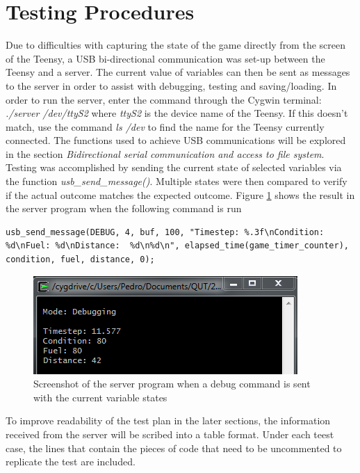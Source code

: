 \documentclass{article}
\begin{document}
\section{Testing Procedures}
Due to difficulties with capturing the state of the game directly from the screen of the Teensy, a USB bi-directional communication was set-up between the Teensy and a server. The current value of variables can then be sent as messages to the server in order to assist with debugging, testing and saving/loading. 
\newline
\newline
In order to run the server, enter the command through the Cygwin terminal: \emph{./server /dev/ttyS2} where \emph{ttyS2} is the device name of the Teensy. If this doesn't match, use the command \emph{ls /dev} to find the name for the Teensy currently connected. 
\newline
\newline
The functions used to achieve USB communications will be explored in the section \emph{Bidirectional serial communication and access to file system}. 
\newline
\newline
Testing was accomplished by sending the current state of selected variables via the function \emph{usb\_send\_message()}. Multiple states were then compared to verify if the actual outcome matches the expected outcome.
\newline
\newline
Figure \ref{test_debug} shows the result in the server program when the following command is run
\begin{lstlisting}[style=CStyle]
	usb_send_message(DEBUG, 4, buf, 100, "Timestep: %.3f\nCondition: %d\nFuel: %d\nDistance:  %d\n%d\n", elapsed_time(game_timer_counter), condition, fuel, distance, 0);
\end{lstlisting}
\begin{figure}[!ht]
	\begin{center}
	\includegraphics[width=0.8\paperwidth]{images/testing_debug}
	\caption{Screenshot of the server program when a debug command is sent with the current variable states}
	\label{test_debug} 
	\end{center}
\end{figure}
To improve readability of the test plan in the later sections, the information received from the server will be scribed into a table format. Under each teest case, the lines that contain the pieces of code that need to be uncommented to replicate the test are included. 
\clearpage
\end{document}
